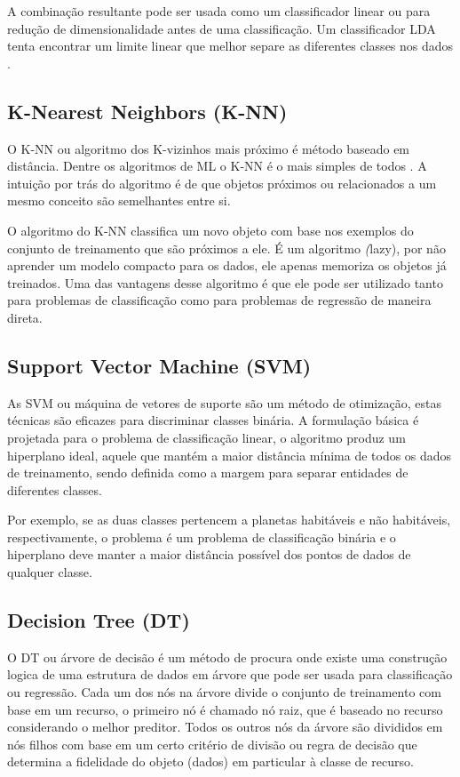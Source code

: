 A combinação resultante pode ser usada como um classificador linear ou para redução de dimensionalidade antes de uma classificação. Um classificador LDA tenta encontrar um limite linear que melhor separe as diferentes classes nos dados \cite{scikit-learn}.  

\subsection{K-Nearest Neighbors (K-NN)} 

O K-NN ou algoritmo dos K-vizinhos mais próximo é método baseado em distância. Dentre os algoritmos de ML o K-NN é o mais simples de todos \cite{datascience}. A intuição por trás do algoritmo é de que objetos próximos ou relacionados a um mesmo conceito são semelhantes entre si. 

O algoritmo do K-NN classifica um novo objeto com base nos exemplos do conjunto de treinamento que são próximos a ele. É um algoritmo  \textit(lazy), por não aprender um modelo compacto para os dados,  ele apenas memoriza os objetos já treinados. Uma das vantagens desse algoritmo é que ele pode ser utilizado tanto para problemas de classificação como para problemas de regressão de maneira direta.  

\subsection{Support Vector Machine (SVM)} 

As SVM ou máquina de vetores de suporte são um método de otimização, estas técnicas são eficazes para discriminar classes binária. A formulação básica é projetada para o problema de classificação linear, o algoritmo produz um hiperplano ideal, aquele que mantém a maior distância mínima de todos os dados de treinamento, sendo definida como a margem para separar entidades de diferentes classes. 

Por exemplo, se as duas classes pertencem a planetas habitáveis e não habitáveis, respectivamente, o problema é um problema de classificação binária e o hiperplano deve manter a maior distância possível dos pontos de dados de qualquer classe.  

\subsection{Decision Tree (DT)} 

O DT ou árvore de decisão é um método de procura onde existe uma construção logica de uma estrutura de dados em árvore que pode ser usada para classificação ou regressão. Cada um dos nós na árvore divide o conjunto de treinamento com base em um recurso, o primeiro nó é chamado nó raiz, que é baseado no recurso considerando o melhor preditor. Todos os outros nós da árvore são divididos em nós filhos com base em um certo critério de divisão ou regra de decisão que determina a fidelidade do objeto (dados) em particular à classe de recurso.  

